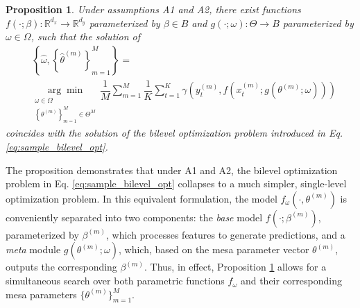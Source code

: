 \documentclass[3p,times,twocolumn]{elsarticle}
\newtheorem{proposition}{Proposition}
\begin{document}
\begin{proposition} \label{prop:PropositionMain}
    Under assumptions A1 and A2, there exist functions $f(\cdot; \beta): \mathbb{R}^{d_x} \rightarrow \mathbb{R}^{d_y}$ parameterized by $\beta \in B$ and $g(\cdot; \omega):\Theta \rightarrow B$ parameterized by $\omega \in \Omega$, such that the solution of
    \begin{equation}\label{eq:sample_singlelevel_opt_alt}
        \begin{split}
            &\left\lbrace \hat{\omega} , \left\lbrace \hat{\theta}^{(m)} \right\rbrace_{m=1}^{M} \right\rbrace= \\
            &  \underset{\substack{\omega \in \Omega \\ \left\lbrace \theta^{(m)} \right\rbrace_{m=1}^{M}\in \Theta^{M}}}{\arg\min} \, \dfrac{1}{M} \sum_{m=1}^{M}  \dfrac{1}{K}\sum_{t=1}^{K} \gamma( y_{t}^{(m)}, f(x_{t}^{(m)};g(\theta^{(m)};\omega)))
        \end{split}
    \end{equation}
    coincides with the solution of the bilevel optimization problem introduced in Eq. \ref{eq:sample_bilevel_opt}.
\end{proposition}
The proposition demonstrates that under A1 and A2, the bilevel optimization problem in Eq. \ref{eq:sample_bilevel_opt} collapses to a much simpler, single-level optimization problem.
In this equivalent formulation, the model $f_{\omega}(\cdot, \theta^{(m)})$ is conveniently separated into two components: the \emph{base} model $f(\cdot; \beta^{(m)})$, parameterized by $\beta^{(m)}$, which processes features to generate predictions, and a \emph{meta} module $g(\theta^{(m)};\omega)$, which, based on the mesa parameter vector $\theta^{(m)}$, outputs the corresponding $\beta^{(m)}$. 
Thus, in effect, Proposition \ref{prop:PropositionMain} allows for a simultaneous search over both parametric functions $f_{\omega}$ and their corresponding mesa parameters $\{ \theta^{(m)} \}_{m=1}^{M}$.
\end{document}
